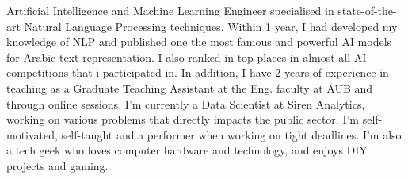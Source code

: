 

\begin{cvparagraph}

Artificial Intelligence and Machine Learning Engineer specialised in state-of-the-art Natural Language Processing techniques. 
Within 1 year, I had developed my knowledge of NLP and published one the most famous and powerful AI models for Arabic text representation. 
I also ranked in top places in almost all AI competitions that i participated in. 
In addition, I have 2 years of experience in teaching as a Graduate Teaching Assistant at the Eng. faculty at AUB and through online sessions.
I'm currently a Data Scientist at Siren Analytics, working on various problems that directly impacts the public sector.
I'm self-motivated, self-taught and a performer when working on tight deadlines.
I'm also a tech geek who loves computer hardware and technology, and enjoys DIY projects and gaming.
\end{cvparagraph}
